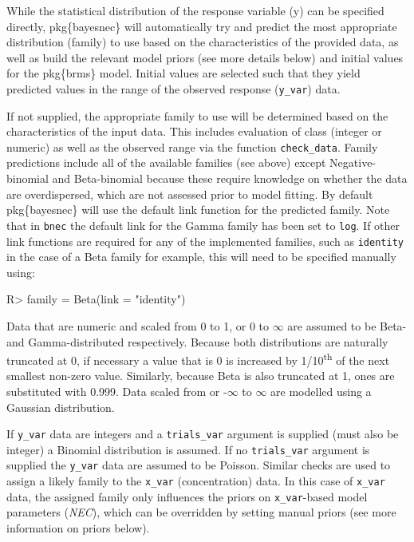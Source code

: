 \documentclass[
]{jss}
\begin{document}
While the statistical distribution of the response variable (y) can be
specified directly, pkg\{bayesnec\} will automatically try and predict
the most appropriate distribution (family) to use based on the
characteristics of the provided data, as well as build the relevant
model priors (see more details below) and initial values for the
pkg\{brms\} model. Initial values are selected such that they yield
predicted values in the range of the observed response (\texttt{y\_var})
data.

If not supplied, the appropriate family to use will be determined based
on the characteristics of the input data. This includes evaluation of
class (integer or numeric) as well as the observed range via the
function \texttt{check\_data}. Family predictions include all of the
available families (see above) except Negative-binomial and
Beta-binomial because these require knowledge on whether the data are
overdispersed, which are not assessed prior to model fitting. By default
pkg\{bayesnec\} will use the default link function for the predicted
family. Note that in \texttt{bnec} the default link for the Gamma family
has been set to \texttt{log}. If other link functions are required for
any of the implemented families, such as \texttt{identity} in the case
of a Beta family for example, this will need to be specified manually
using:

\begin{CodeChunk}
\begin{CodeInput}
R> family = Beta(link = "identity")
\end{CodeInput}
\end{CodeChunk}

Data that are numeric and scaled from 0 to 1, or 0 to \(\infty\) are
assumed to be Beta- and Gamma-distributed respectively. Because both
distributions are naturally truncated at 0, if necessary a value that is
0 is increased by 1/10\textsuperscript{th} of the next smallest non-zero
value. Similarly, because Beta is also truncated at 1, ones are
substituted with 0.999. Data scaled from or -\(\infty\) to \(\infty\)
are modelled using a Gaussian distribution.

If \texttt{y\_var} data are integers and a \texttt{trials\_var} argument
is supplied (must also be integer) a Binomial distribution is assumed.
If no \texttt{trials\_var} argument is supplied the \texttt{y\_var} data
are assumed to be Poisson. Similar checks are used to assign a likely
family to the \texttt{x\_var} (concentration) data. In this case of
\texttt{x\_var} data, the assigned family only influences the priors on
\texttt{x\_var}-based model parameters (\emph{NEC}), which can be
overridden by setting manual priors (see more information on priors
below).
\end{document}
